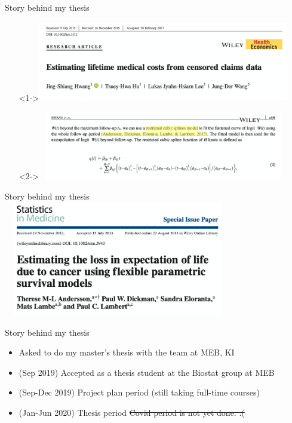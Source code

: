 \documentclass{beamer}
\begin{document}
\begin{frame}{Story behind my thesis}

\begin{itemize}
\item[]<1->\includegraphics[width=11cm,height=3.5cm]{image/Hwang_2017}
\item[]<2->\includegraphics[width=11cm,height=3cm]{image/Hwang_2017_rcs}
\end{itemize}

\end{frame}




\begin{frame}{Story behind my thesis}
\includegraphics[width=10cm,height=5cm]{image/Andersson_2013}
\end{frame}


\begin{frame}{Story behind my thesis}
\begin{itemize}
	\item<1->  Asked to do my master's thesis with the team at MEB, KI
	\item<2->  (Sep 2019) Accepted as a thesis student at the Biostat group at MEB 
	\item<3->  (Sep-Dec 2019) Project plan period (still taking full-time courses) 
	\item<4>   (Jan-Jun 2020) Thesis period \st{Covid period is not yet done. :(}
\end{itemize}
\end{frame}
\end{document}
